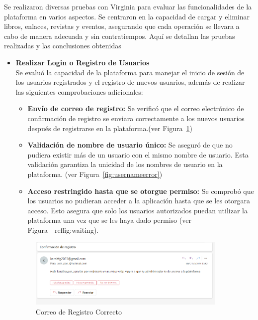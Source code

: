 \documentclass[a4paper, 12pt]{book}
\begin{document}
Se realizaron diversas pruebas con Virginia para evaluar las funcionalidades de la plataforma en varios aspectos. Se centraron en la 
capacidad de cargar y eliminar libros, enlaces, revistas y eventos, asegurando que cada operación se llevara a cabo de manera adecuada y sin contratiempos.
Aquí se detallan las pruebas realizadas y las conclusiones obtenidas
\begin{itemize}
  \item \textbf{ Realizar Login o Registro de Usuarios}\\
  Se evaluó la capacidad de la plataforma para manejar el inicio de sesión de los usuarios registrados y el registro de nuevos usuarios, además de realizar las siguientes comprobaciones adicionales:
    \begin{itemize}
      \item \textbf{Envío de correo de registro:} Se verificó que el correo electrónico de confirmación de registro se enviara correctamente a los nuevos usuarios 
      después de registrarse en la plataforma.(ver Figura~\ref{fig:registrook})
      \item \textbf{Validación de nombre de usuario único:} Se aseguró de que no pudiera existir más de un usuario con el mismo nombre de usuario. Esta validación 
      garantiza la unicidad de los nombres de usuario en la plataforma. (ver Figura~\ref{fig:usernameerror})
      \item \textbf{Acceso restringido hasta que se otorgue permiso:}  Se comprobó que los usuarios no pudieran acceder a la aplicación hasta que se les otorgara acceso. 
      Esto asegura que solo los usuarios autorizados puedan utilizar la plataforma una vez que se les haya dado permiso (ver Figura~\ ref{fig:waiting}).
    \end{itemize}

    \begin{figure}
      \centering
      \includegraphics[width=0.9\textwidth]{img/correoresgistro.png}
      \caption{Correo de Registro Correcto}
      \label{fig:registrook}
    \end{figure}


\end{itemize}
\end{document}
